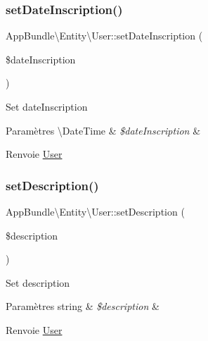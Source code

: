 \subsubsection{\texorpdfstring{set\+Date\+Inscription()}{setDateInscription()}}
{\footnotesize\ttfamily App\+Bundle\textbackslash{}\+Entity\textbackslash{}\+User\+::set\+Date\+Inscription (\begin{DoxyParamCaption}\item[{}]{\$date\+Inscription }\end{DoxyParamCaption})}

Set date\+Inscription


\begin{DoxyParams}[1]{Paramètres}
\textbackslash{}\+Date\+Time & {\em \$date\+Inscription} & \\
\hline
\end{DoxyParams}
\begin{DoxyReturn}{Renvoie}
\hyperlink{classAppBundle_1_1Entity_1_1User}{User} 
\end{DoxyReturn}
\mbox{\label{classAppBundle_1_1Entity_1_1User_af69d6db9253e066027e55c07c209b392}} 
\subsubsection{\texorpdfstring{set\+Description()}{setDescription()}}
{\footnotesize\ttfamily App\+Bundle\textbackslash{}\+Entity\textbackslash{}\+User\+::set\+Description (\begin{DoxyParamCaption}\item[{}]{\$description }\end{DoxyParamCaption})}

Set description


\begin{DoxyParams}[1]{Paramètres}
string & {\em \$description} & \\
\hline
\end{DoxyParams}
\begin{DoxyReturn}{Renvoie}
\hyperlink{classAppBundle_1_1Entity_1_1User}{User} 
\end{DoxyReturn}
\mbox{\label{classAppBundle_1_1Entity_1_1User_a717949a66aa01fdba29d464294d60723}} 
